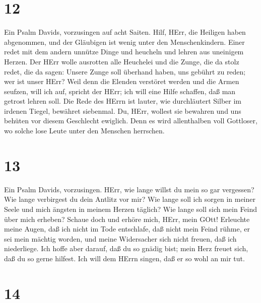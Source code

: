 \hypertarget{section-11}{%
\section{12}\label{section-11}}

 Ein Psalm Davids, vorzusingen auf acht Saiten. 
Hilf, HErr, die Heiligen haben abgenommen, und der Gläubigen ist wenig
unter den Menschenkindern.  Einer redet mit dem andern
unnütze Dinge und heucheln und lehren aus uneinigem Herzen. 
Der HErr wolle ausrotten alle Heuchelei und die Zunge, die da stolz
redet,  die da sagen: Unsere Zunge soll überhand haben, uns
gebührt zu reden; wer ist unser HErr?  Weil denn die Elenden
verstöret werden und die Armen seufzen, will ich auf, spricht der HErr;
ich will eine Hilfe schaffen, daß man getrost lehren soll. 
Die Rede des HErrn ist lauter, wie durchläutert Silber im irdenen
Tiegel, bewähret siebenmal.  Du, HErr, wollest sie bewahren
und uns behüten vor diesem Geschlecht ewiglich.  Denn es
wird allenthalben voll Gottloser, wo solche lose Leute unter den
Menschen herrschen.

\hypertarget{section-12}{%
\section{13}\label{section-12}}

 Ein Psalm Davids, vorzusingen.  HErr, wie lange
willst du mein so gar vergessen? Wie lange verbirgest du dein Antlitz
vor mir?  Wie lange soll ich sorgen in meiner Seele und mich
ängsten in meinem Herzen täglich? Wie lange soll sich mein Feind über
mich erheben?  Schaue doch und erhöre mich, HErr, mein GOtt!
Erleuchte meine Augen, daß ich nicht im Tode entschlafe, 
daß nicht mein Feind rühme, er sei mein mächtig worden, und meine
Widersacher sich nicht freuen, daß ich niederliege.  Ich
hoffe aber darauf, daß du so gnädig bist; mein Herz freuet sich, daß du
so gerne hilfest. Ich will dem HErrn singen, daß er so wohl an mir tut.

\hypertarget{section-13}{%
\section{14}\label{section-13}}

